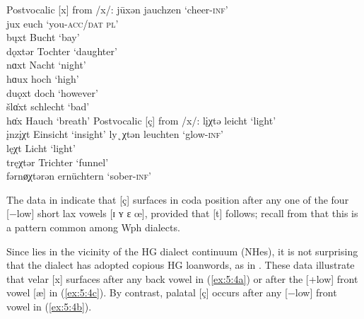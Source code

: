 \ea%
\label{ex:5:2}
Postvocalic [x] from /x/:
\ea\label{ex:5:2a} jūxən    \tab [ʝuːxən] \tab jauchzen \tab ‘cheer-\textsc{inf}’  \\
\ex\label{ex:5:2b} jux      \tab [ʝux]    \tab euch     \tab ‘you-\textsc{acc/dat} \textsc{pl}’ \\
\ex\label{ex:5:2c} b\k{u}xt \tab [bʊxt]   \tab Bucht    \tab ‘bay’       \\
\ex\label{ex:5:2d} dǫxtər   \tab [dɔxtər] \tab Tochter  \tab ‘daughter’  \\
\ex\label{ex:5:2e} nɑxt     \tab [nɑxt]   \tab Nacht    \tab ‘night’     \\
\ex\label{ex:5:2f} hɑux     \tab [hɑux]   \tab hoch     \tab ‘high’     \\
\ex\label{ex:5:2g} duǫxt    \tab [duɔx]   \tab doch     \tab ‘however’  \\
\ex\label{ex:5:2h} šlɑ̇xt   \tab [ʃlæxt]  \tab schlecht \tab ‘bad’      \\
    hɑ̇x                     \tab [hæx]    \tab Hauch    \tab ‘breath’  
\z
\ex%
    \label{ex:5:3}
    Postvocalic [ç] from /x/:
\ea\label{ex:5:3a} l\k{i}χtə      \tab [lɪçtə]   \tab leicht     \tab ‘light’   \\
    \k{i}nz\k{i}χt \tab [ɪnzɪçt]  \tab Einsicht   \tab ‘insight’ 
\ex\label{ex:5:3b} ly˛χtən        \tab [lʏçtən]  \tab leuchten   \tab ‘glow-\textsc{inf}’ \\
\ex\label{ex:5:3c} lęχt           \tab [lɛçt]    \tab  Licht     \tab ‘light’   \\
    tręχtər        \tab [trɛçtər] \tab  Trichter  \tab  ‘funnel’ \\
\ex\label{ex:5:3d} fərnø̜χtərən    \tab [fərnœçtərən] \tab  ernüchtern \tab ‘sober-\textsc{inf}’\\
   \z
\z 


The data in  indicate that [ç] surfaces in coda position after any one of the four [−low] short lax vowels [ɪ ʏ ɛ œ], provided that [t] follows; recall from  that this is a pattern common among Wph dialects.

Since  lies in the vicinity of the HG dialect continuum (NHes), it is not surprising that the dialect has adopted copious HG loanwords, as in . These data illustrate that velar [x] surfaces after any back vowel in (\ref{ex:5:4a}) or after the [+low] front vowel [æ] in (\ref{ex:5:4c}). By contrast, palatal [ç] occurs after any [−low] front vowel in (\ref{ex:5:4b}).

